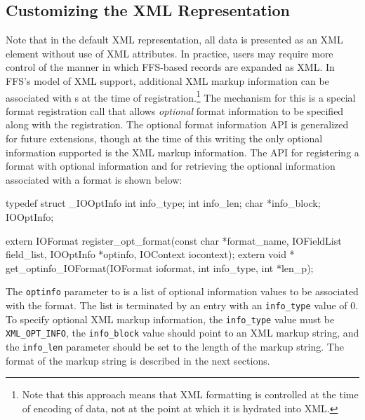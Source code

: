 \subsection{Customizing the XML Representation}
Note that in the default XML representation, all data is presented as an XML
element without use of XML attributes.  In practice, users may require more
control of the manner in which FFS-based records are expanded as XML.
In FFS's model of XML support, additional XML markup information can be
associated with s at the time of
registration.\footnote{Note that this approach means that XML formatting is
controlled at the time of encoding of data, not at the point at which it is
hydrated into XML.}  The mechanism for this is a special format registration
call that allows {\it optional} format information to be specified along
with the registration.  The optional format information API is generalized
for future extensions, though at the time of this writing the only optional
information supported is the XML markup information.  The API for registering a format with
optional information and for retrieving the optional information associated
with a format is shown below:
\begin{Code}
typedef struct _IOOptInfo {
    int info_type;
    int info_len;
    char *info_block;
} IOOptInfo;

extern IOFormat register_opt_format(const char *format_name, IOFieldList field_list,
				    IOOptInfo *optinfo, IOContext iocontext);
extern void * get_optinfo_IOFormat(IOFormat ioformat, int info_type, int *len_p);
\end{Code}
The {\tt optinfo} parameter to  is a list
of optional information values to be associated with the format.  The list
is terminated by an entry with an {\tt info\_type} value of 0.  To specify
optional XML markup information, the {\tt info\_type} value must be {\tt
XML\_OPT\_INFO}, the {\tt info\_block} value should point to an XML markup
string, and the {\tt info\_len} parameter should be set to the length of the
markup string.  The format of the markup string is described in the next
sections.

